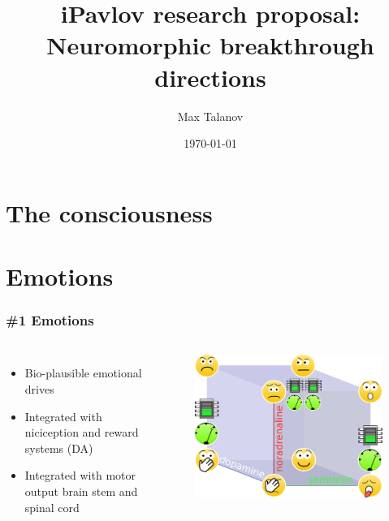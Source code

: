 \documentclass[12pt, aspectratio=169]{beamer}
\title[HSE research proposal]{iPavlov research proposal: \\Neuromorphic breakthrough directions} %
\author[Max Talanov]{
  Max Talanov
}
\institute[for: HSE] %
{
for HSE \\ %
\medskip
\textit{max.talanov@gmail.com} %
}
\date{\today} %
\begin{document}
\begin{frame}
\titlepage %
\end{frame}



\section{The consciousness} %
\section{Emotions}

\begin{frame}
\frametitle{\#1 Emotions}
\begin{columns}[c] %


\begin{itemize}
\item Bio-plausible emotional drives
\item Integrated with niciception and reward systems (DA)
\item Integrated with motor output brain stem and spinal cord
\end{itemize}

\begin{figure}
\includegraphics[width=0.8\linewidth]{cube_of_emotional_parameters_machine}
\end{figure}
\end{columns}
\end{frame}
\end{document}
